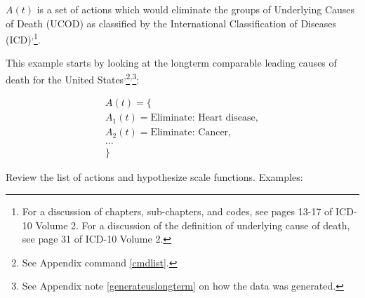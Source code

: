 \documentclass[10pt, a4paper, twocolumn]{IEEEconf}
\begin{document}
$A(t)$ is a set of actions which would eliminate the groups of Underlying Causes of Death (UCOD) as classified by the International Classification of Diseases (ICD)\cite{icd10vol1,icd10vol2,icd10vol3}\textsuperscript{,}\footnote{For a discussion of chapters, sub-chapters, and codes, see pages 13-17 of ICD-10 Volume 2\cite{icd10vol2}.
For a discussion of the definition of underlying cause of death, see page 31 of ICD-10 Volume 2\cite{icd10vol2}.}.

This example starts by looking at the longterm comparable leading causes of death for the United States\cite{uslcod19001998,nbermortality,centers2017underlying,uspopulation19002001,censusestimates19001999}\textsuperscript{,}\footnote{See Appendix command \ref{cmdlist}.}\textsuperscript{,}\footnote{See Appendix note \ref{generateuslongterm} on how the data was generated.}:

\begin{equation*}
  \begin{gathered}
    A(t) = \{\\
    A_1(t) = \textrm{Eliminate: Heart disease},\\
    A_2(t) = \textrm{Eliminate: Cancer},\\
    \textrm{\ldots}\\
    \}
  \end{gathered}
\end{equation*}

Review the list of actions and hypothesize scale functions. Examples:
\end{document}

